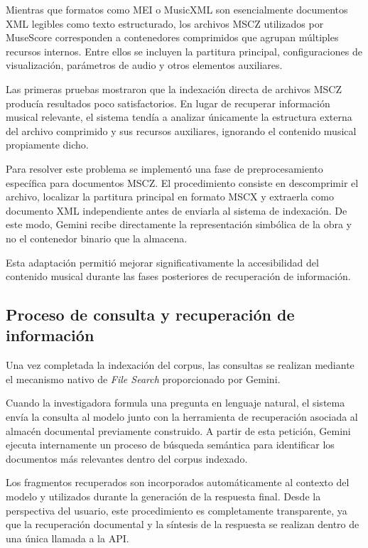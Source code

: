 Mientras que formatos como MEI o MusicXML son esencialmente documentos XML legibles como texto estructurado, los archivos MSCZ utilizados por MuseScore corresponden a contenedores comprimidos que agrupan múltiples recursos internos. Entre ellos se incluyen la partitura principal, configuraciones de visualización, parámetros de audio y otros elementos auxiliares.

Las primeras pruebas mostraron que la indexación directa de archivos MSCZ producía resultados poco satisfactorios. En lugar de recuperar información musical relevante, el sistema tendía a analizar únicamente la estructura externa del archivo comprimido y sus recursos auxiliares, ignorando el contenido musical propiamente dicho.

Para resolver este problema se implementó una fase de preprocesamiento específica para documentos MSCZ. El procedimiento consiste en descomprimir el archivo, localizar la partitura principal en formato MSCX y extraerla como documento XML independiente antes de enviarla al sistema de indexación. De este modo, Gemini recibe directamente la representación simbólica de la obra y no el contenedor binario que la almacena.

Esta adaptación permitió mejorar significativamente la accesibilidad del contenido musical durante las fases posteriores de recuperación de información.

\subsection{Proceso de consulta y recuperación de información}
Una vez completada la indexación del corpus, las consultas se realizan mediante el mecanismo nativo de \textit{File Search} proporcionado por Gemini.

Cuando la investigadora formula una pregunta en lenguaje natural, el sistema envía la consulta al modelo junto con la herramienta de recuperación asociada al almacén documental previamente construido. A partir de esta petición, Gemini ejecuta internamente un proceso de búsqueda semántica para identificar los documentos más relevantes dentro del corpus indexado.

Los fragmentos recuperados son incorporados automáticamente al contexto del modelo y utilizados durante la generación de la respuesta final. Desde la perspectiva del usuario, este procedimiento es completamente transparente, ya que la recuperación documental y la síntesis de la respuesta se realizan dentro de una única llamada a la API.

